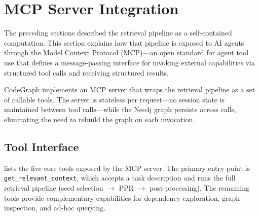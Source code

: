 \section{MCP Server Integration}
\label{sec:mcp-integration}

The preceding sections described the retrieval pipeline as a self-contained computation. This section explains how that pipeline is exposed to AI agents through the Model Context Protocol (MCP)---an open standard for agent tool use that defines a message-passing interface for invoking external capabilities via structured tool calls and receiving structured results.

CodeGraph implements an MCP server that wraps the retrieval pipeline as a set of callable tools. The server is stateless per request---no session state is maintained between tool calls---while the Neo4j graph persists across calls, eliminating the need to rebuild the graph on each invocation.

\subsection{Tool Interface}
\label{sec:tool-interface}

 lists the five core tools exposed by the MCP server. The primary entry point is \texttt{get\_relevant\_context}, which accepts a task description and runs the full retrieval pipeline (seed selection $\to$ PPR $\to$ post-processing). The remaining tools provide complementary capabilities for dependency exploration, graph inspection, and ad-hoc querying.

